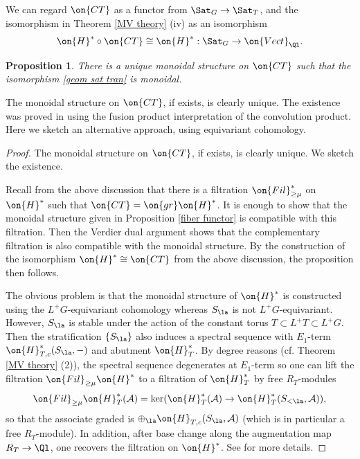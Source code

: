 \documentclass[]{pcmi}
\theoremstyle{plain}
\newtheorem{prop}[equation]{Proposition}
\theoremstyle{remark}
\theoremstyle{definition}
\newcommand{\mA}{{\mathcal A}}
\begin{document}
We can regard $\on{CT}$ as a functor from $\Sat_G\to \Sat_T$, and the isomorphism in Theorem \ref{MV theory} (iv) as an isomorphism 
\begin{equation}\label{geom sat tran}
\on{H}^*\circ \on{CT}\cong \on{H}^*: \Sat_G\to \on{Vect}_\Ql.
\end{equation}
\begin{prop}
There is a unique monoidal structure on $\on{CT}$ such that the isomorphism \eqref{geom sat tran} is monoidal. 
\end{prop}
The monoidal structure on $\on{CT}$, if exists, is clearly unique. The existence was proved in \cite[Proposition 6.4]{MV} using the fusion product interpretation of the convolution product. Here we sketch an alternative approach, using equivariant cohomology.
\begin{proof}
The monoidal structure on $\on{CT}$, if exists, is clearly unique. We sketch the existence. 


Recall from the above discussion that there is a filtration $\on{Fil}^*_{\geq \mu}$ on $\on{H}^*$ such that $\on{CT}=\on{gr}\on{H}^*$. It is enough to show that the monoidal structure given in Proposition \ref{fiber functor} is compatible with this filtration. 
Then the Verdier dual argument shows that the complementary filtration is also compatible with the monoidal structure. By the construction of the isomorphism $\on{H}^*\cong \on{CT}$ from the above discussion, the proposition then follows.



The obvious problem is that the monoidal structure of $\on{H}^*$ is constructed using the $L^+G$-equivariant cohomology whereas $S_\la$ is not $L^+G$-equivariant. However, $S_\la$ is stable under the action of the constant torus $T\subset L^+T\subset L^+G$.
Then the stratification $\{S_\la\}$ also induces a spectral sequence with $E_1$-term $\on{H}_{T,c}^*(S_\la,-)$ and abutment $\on{H}^*_{T}$. By degree reasons (cf. Theorem \ref{MV theory} (2)), the spectral sequence degenerates at $E_1$-term so one can lift the filtration $\on{Fil}_{\geq \mu}\on{H}^*$ to a filtration of $\on{H}^*_{T}$ by free $R_{T}$-modules
\[\on{Fil}_{\geq \mu}\on{H}_{T}^*(\mA)=\ker(\on{H}_{T}^*(\mA)\to \on{H}_{T}^*(S_{<\la},\mA)),\]
so that the associate graded is $\oplus_\la\on{H}_{T,c}(S_\la,\mA)$ (which is in particular a free $R_{T}$-module). 
In addition, after base change along the augmentation map $R_{T}\to\Ql$, one recovers the filtration on $\on{H}^*$.
See \cite[\S\ 2.2]{YZ} for more details. 



\end{proof}
\end{document}
